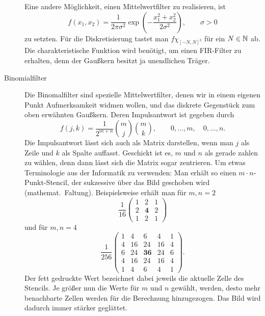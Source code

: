 \begin{example}
\begin{description}
  Eine andere Möglichkeit, einen Mittelwertfilter zu realisieren, ist
  \[
    f(x_{1},x_{2}) 
      = \frac{1}{2\pi\sigma^{2}} \exp\left( -\frac{x_{1}^{2} + x_{2}^{2}}{2\sigma^{2}} \right),
      \qquad \sigma > 0
  \]
  zu setzten. Für die Diskretisierung tastet man $ f\chi_{[-N,N]^{2}} $ für ein $ N \in \mathbb{N} $ ab. Die
  charakteristische Funktion wird benötigt, um einen FIR-Filter zu erhalten, denn der Gaußkern
  besitzt ja unendlichen Träger.
\item [Binomialfilter]
  Die Binomalfilter sind spezielle Mittelwertfilter, denen wir in einem eigenen Punkt 
  Aufmerksamkeit widmen wollen, und das diskrete Gegenstück zum oben erwähnten Gaußkern. Deren 
  Impulsantwort ist gegeben durch
  \[
    f(j,k) = \frac{1}{2^{m + n}} \binom{m}{j} \binom{m}{k},
      \qquad 0, \ldots, m, \quad 0, \ldots, n.
  \]
  Die Impulsantwort lässt sich auch als Matrix darstellen, wenn man $ j $ als Zeile und $ k $ als
  Spalte auffasst. Geschickt ist es, $ m $ und $ n $ als gerade zahlen zu wählen, denn dann lässt 
  sich die Matrix sogar zentrieren. Um etwas Terminologie aus der Informatik zu verwenden: Man 
  erhält so einen $ m \cdot n $-Punkt-Stencil, der sukzessive über das Bild geschoben wird 
  (mathemat.\ Faltung). Beispielsweise erhält man für $ m,n = 2 $
  \[
    \frac{1}{16} \begin{pmatrix}
    1 & 2 & 1 \\
    2 & \mathbf{4} & 2 \\
    1 & 2 & 1
    \end{pmatrix}
  \]
  und für $ m,n=4 $
  \[
    \frac{1}{256} \begin{pmatrix}
    1 &  4 & 6  & 4  & 1 \\
    4 & 16 & 24 & 16 & 4 \\
    6 & 24 & \mathbf{36} & 24 & 6 \\
    4 & 16 & 24 & 16 & 4 \\
    1 &  4 &  6 &  4 & 1
    \end{pmatrix}.
  \]
  Der fett gedruckte Wert bezeichnet dabei jeweils die aktuelle Zelle des Stencils. Je größer nun 
  die Werte für $ m $ und $ n $ gewählt, werden, desto mehr benachbarte Zellen werden für die
  Berechnung hinzugezogen. Das Bild wird dadurch immer stärker geglättet.
  

\end{description}
\end{example}
